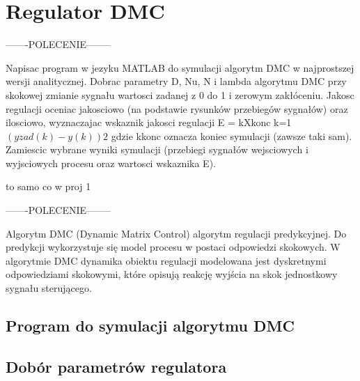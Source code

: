 \section{Regulator DMC}

-------POLECENIE--------

Napisac program w jezyku MATLAB do symulacji algorytm DMC w najprostszej
wersji analitycznej. Dobrac parametry D, Nu, N i lambda algorytmu DMC przy skokowej
zmianie sygnału wartosci zadanej z 0 do 1 i zerowym zakłóceniu. Jakosc regulacji
oceniac jakosciowo (na podstawie rysunków przebiegów sygnałów) oraz ilosciowo, wyznaczajac
wskaznik jakosci regulacji
E =
kXkonc
k=1
$(yzad(k) - y(k))2$
gdzie kkonc oznacza koniec symulacji (zawsze taki sam). Zamiescic wybrane wyniki
symulacji (przebiegi sygnałów wejsciowych i wyjsciowych procesu oraz wartosci wskaznika
E).

to samo co w proj 1

-------POLECENIE--------


Algorytm DMC (Dynamic Matrix Control) algorytm regulacji predykcyjnej. 
Do predykcji wykorzystuje się model procesu w postaci odpowiedzi skokowych. 
W algorytmie DMC dynamika obiektu regulacji modelowana jest dyskretnymi odpowiedziami skokowymi, 
które opisują reakcję wyjścia na skok jednostkowy sygnału sterującego.
 


\subsection{Program do symulacji algorytmu DMC}

\subsection{Dobór parametrów regulatora}
